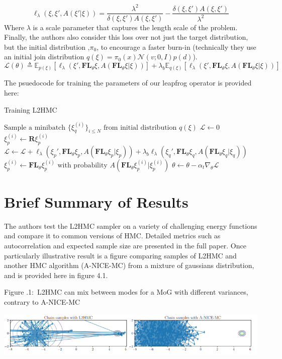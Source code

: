 \documentclass[twoside]{article}
\newcounter{lecnum}
\newcommand{\fig}[3]{
			\vspace{#2}
			\begin{center}
			Figure \thelecnum.#1:~#3
			\end{center}
	}
\begin{document}
\begin{equation*}
    \ell_{\lambda} (\xi, \xi', A(\xi'|\xi)) = \frac{\lambda^2}{\delta(\xi,\xi')A(\xi,\xi')} -\frac{\delta(\xi,\xi')A(\xi,\xi')}{\lambda^2}
\end{equation*}
Where $\lambda$ is a scale parameter that captures the length scale of the problem. Finally, the authors also consider this loss over not just the target distribution, but the initial distribution ,$\pi_0$, to encourage a faster burn-in (technically they use an initial join distribution $q(\xi) = \pi_0(x)\mathcal{N}(v;0,I)p(d)$).
\begin{equation*}
    \mathcal{L}(\theta) \triangleq \mathbb{E}_{p(\xi)}[\ell_{\lambda}(\xi', \textbf{FL}_\theta \xi, A(\textbf{FL}_\theta \xi | \xi))] + \lambda_b \mathbb{E}_{q(\xi)}[\ell_{\lambda}(\xi', \textbf{FL}_\theta \xi, A(\textbf{FL}_\theta \xi | \xi))]
\end{equation*}

The psuedocode for training the parameters of our leapfrog operator is provided here:

\begin{algorithm}[H]
\caption{Training L2HMC}
\label{L2HMCalgorithm}
\begin{algorithmic}[1]
    \State $\text{Sample a minibatch } \{ \xi_q^{(i)} \}_{i\leq N}  \text{ from initial distribution } q(\xi) $
    \State $\mathcal{L} \leftarrow 0$
        \State $\xi_p^{(i)} \leftarrow \textbf{R}\xi_p^{(i)}$
        \State $\mathcal{L} \leftarrow \mathcal{L} + \ell_{\lambda}(\xi_p', \textbf{FL}_\theta \xi_p, A(\textbf{FL}_\theta \xi_p | \xi_p)) + \lambda_b \ell_{\lambda}(\xi_q', \textbf{FL}_\theta \xi_q, A(\textbf{FL}_\theta \xi_q | \xi_q)) $
        \State $\xi_p^{(i)} \leftarrow \textbf{FL}_\theta \xi_p^{(i)} \text{ with probability } A(\textbf{FL}_\theta \xi_p^{(i)}|\xi_p^{(i)})$
    \EndFor
    \State $\theta \leftarrow \theta - \alpha_t \nabla_\theta \mathcal{L}$
\EndFor
\end{algorithmic}
\end{algorithm}


\section{Brief Summary of Results}
The authors test the L2HMC sampler on a variety of challenging energy functions and compare it to common versions of HMC. Detailed metrics such as autocorrelation and expected sample size are presented in the full paper. Once particularly illustrative result is a figure comparing samples of L2HMC and another HMC algorithm (A-NICE-MC) from a mixture of gaussians distribution, and is provided here in figure 4.1.


\fig{1}{0.2in}{L2HMC can mix between modes for a MoG with different variances, contrary to A-NICE-MC}
\includegraphics[width=\textwidth]{L2HMC-results.PNG}










\end{document}
